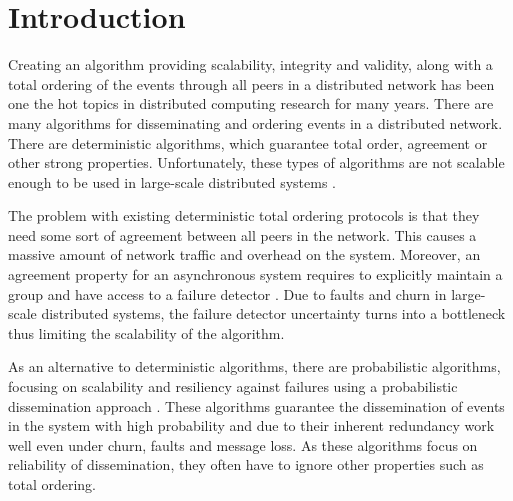 \section{Introduction}

Creating an algorithm providing scalability, integrity and validity, along with a total ordering of the events through all peers in a distributed network has been one the hot topics in distributed computing research for many years. There are many algorithms for disseminating and ordering events in a distributed network. There are deterministic algorithms, which guarantee total order, agreement or other strong properties. Unfortunately, these types of algorithms are not scalable enough to be used in large-scale distributed systems \autocites[]{defago2004total}[]{lamport1978time}.
\par
The problem with existing deterministic total ordering protocols is that they need some sort of agreement between all peers in the network. This causes a massive amount of network traffic and overhead on the system.
Moreover, an agreement property for an asynchronous system requires to
explicitly maintain a group and have access to a failure detector \autocites[]{chandra1996weakest}[]{chandra1996unreliable}. Due to faults and churn in large-scale distributed systems, the failure detector uncertainty turns into a bottleneck thus limiting the scalability of the algorithm.
\par
As an alternative to deterministic algorithms, there are probabilistic algorithms, focusing on scalability and resiliency against failures using a probabilistic dissemination approach  \autocite{birman1999bimodal,carvalho2007emergent,demers1987epidemic,eugster2003lightweight,felber2002probabilistic,hayden1996probabilistic,kim2004gossip,Koldehofe02simplegossiping}. These algorithms guarantee the dissemination of events in the system with high probability and due to their inherent redundancy work well even under churn, faults and message loss.
As these algorithms focus on reliability of dissemination, they often have to ignore other properties such as total ordering. 

